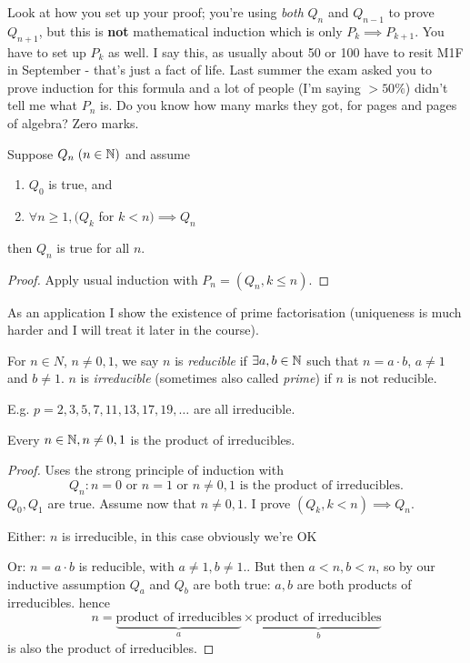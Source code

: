 \documentclass[10pt]{scrartcl}
\begin{document}
\begin{warning}
Look at how you set up your proof; you're using \emph{both} $Q_n$ and $Q_{n-1}$ to prove $Q_{n+1}$, but this is \textbf{not} mathematical induction which is only $P_k \implies P_{k+1}$. You have to set up $P_k$ as well. I say this, as usually about 50 or 100 have to resit M1F in September - that's just a fact of life. Last summer the exam asked you to prove induction for this formula and a lot of people (I'm saying $> 50\%$) didn't tell me what $P_n$ is. Do you know how many marks they got, for pages and pages of algebra? Zero marks.
\end{warning}\vsp


\begin{definition}
Suppose $Q_n\; (n \in\mathbb{N})$  and assume 
\begin{enumerate}
\item $Q_0$ is true, and
\item $\forall n \geq 1, (Q_k$ for $k < n)\implies Q_n$	
\end{enumerate}
then $Q_n$ is true for all $n$.
\end{definition}

\begin{proof} Apply usual induction with $P_n = (Q_n, k \leq n)$.
\end{proof}

As an application I show the existence of prime factorisation (uniqueness is much harder and I will treat it later in the course).\\


\begin{definition}
For $n \in N$, $n \neq 0,1$, we say $n$ is \emph{reducible} if $\exists a,b \in\mathbb{N}$ such that $n = a\cdot b$, $a \neq 1$ and $b \neq 1$. $n$ is \emph{irreducible} (sometimes also called \emph{prime}) if $n$ is not reducible. 		
\end{definition}

E.g. $p = 2,3,5,7,11,13,17,19,\dots$ are all irreducible. \\

\begin{theorem} 
Every $n \in\mathbb{N}, n \neq 0,1$ is the product of irreducibles. 	
\end{theorem}

\begin{proof}
Uses the strong principle of induction with 
\[Q_n: n = 0\text{ or }n = 1\text{ or }n \neq 0,1 \text{ is the product of irreducibles.}\]$Q_0, Q_1$ are true. Assume now that $n \neq 0,1$. I prove $(Q_k, k< n) \implies Q_n$. 

{Either:} $n$ is irreducible, in this case obviously we're OK

{Or:} $n = a\cdot b$ is reducible, with $a \neq 1, b \neq 1.$. But then $a < n, b < n$, so by our inductive assumption $Q_a$ and $Q_b$ are both true: $a,b$ are both products of irreducibles. hence 
\[n = \underbrace{\text{product of irreducibles}}_{a} \times \underbrace{\text{product of irreducibles}}_{b}\]
is also the product of irreducibles.
\end{proof}
\end{document}
